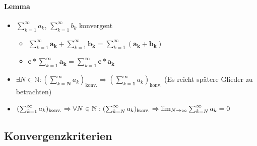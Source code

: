 \paragraph{Lemma}

\begin{itemize}
  \item $\sum_{k=1}^\infty a_k$, $\sum_{k=1}^\infty b_k$ konvergent
        \begin{itemize}
          \item $\sum_{k=1}^\infty \mathbf{a_k} + \sum_{k=1}^\infty \mathbf{b_k} = \sum_{k=1}^\infty (\mathbf{a_k + b_k})$
          \item $\mathbf{c *} \sum_{k=1}^\infty \mathbf{a_k} = \sum_{k=1}^\infty \mathbf{c * a_k}$
        \end{itemize}

  \item $\exists N \in \mathbb{N}: (\sum_{k=\boldsymbol{N}}^\infty a_k)_\text{konv.} \Rightarrow (\sum_{k=\boldsymbol{1}}^\infty a_k)_\text{konv.}$ (Es reicht spätere Glieder zu betrachten)

  \item $(\sum_{k=1}^\infty a_k)_\text{konv.} \linebreak \Rightarrow \forall N \in \mathbb{N}: (\sum_{k=N}^\infty a_k)_\text{konv.} \linebreak \Rightarrow \lim_{N \rightarrow \infty} \sum_{k=N}^\infty a_k = 0$
\end{itemize}

\subsection{Konvergenzkriterien}

